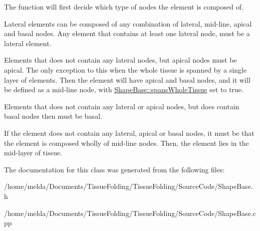 The function will first decide which type of nodes the element is composed of.

Lateral elements can be composed of any combination of lateral, mid-\/line, apical and basal nodes. Any element that contains at least one lateral node, must be a lateral element.

Elements that does not contain any lateral nodes, but apical nodes must be apical. The only exception to this when the whole tissue is spanned by a single layer of elements. Then the element will have apical and basal nodes, and it will be defined as a mid-\/line node, with \hyperlink{classShapeBase_adafe85bbee6173d2a321408cd8b63db3}{Shape\+Base\+::spans\+Whole\+Tissue} set to true.

Elements that does not contain any lateral or apical nodes, but does contain basal nodes then must be basal.

If the element does not contain any lateral, apical or basal nodes, it must be that the element is composed wholly of mid-\/line nodes. Then, the element lies in the mid-\/layer of tissue.

The documentation for this class was generated from the following files\+:\begin{DoxyCompactItemize}
\item 
/home/melda/\+Documents/\+Tissue\+Folding/\+Tissue\+Folding/\+Source\+Code/Shape\+Base.\+h\item 
/home/melda/\+Documents/\+Tissue\+Folding/\+Tissue\+Folding/\+Source\+Code/Shape\+Base.\+cpp\end{DoxyCompactItemize}
